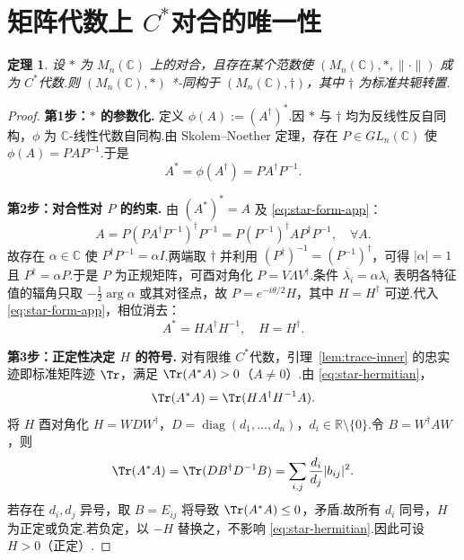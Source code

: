 \documentclass{ctexart}
\newtheorem{theorem}{定理}[section]
\theoremstyle{plain}
\newtheorem*{proof}{证明}
\theoremstyle{plain}
\begin{document}
\section{矩阵代数上 $C^*$对合的唯一性}\label{app:involution-uniqueness}



\begin{theorem}\label{thm:involution-unique}
设 $*$ 为 $M_n(\mathbb{C})$ 上的对合，且存在某个范数使 $(M_n(\mathbb{C}), *, \|\cdot\|)$ 成为 $C^*$代数.则 $(M_n(\mathbb{C}), *)$ *-同构于 $(M_n(\mathbb{C}), \dagger)$，其中 $\dagger$ 为标准共轭转置.
\end{theorem}

\begin{proof}
\textbf{第1步：$*$ 的参数化.} 定义 $\phi(A) := (A^\dagger)^*$.因 $*$ 与 $\dagger$ 均为反线性反自同构，$\phi$ 为 $\mathbb{C}$-线性代数自同构.由 Skolem--Noether 定理，存在 $P \in GL_n(\mathbb{C})$ 使 $\phi(A) = P A P^{-1}$.于是
\begin{equation}\label{eq:star-form-app}
    A^* = \phi(A^\dagger) = P A^\dagger P^{-1}.
\end{equation}

\textbf{第2步：对合性对 $P$ 的约束.} 由 $(A^*)^* = A$ 及 \eqref{eq:star-form-app}：
\begin{equation*}
    A = P (P A^\dagger P^{-1})^\dagger P^{-1} = P (P^{-1})^\dagger A P^\dagger P^{-1}, \quad \forall A.
\end{equation*}
故存在 $\alpha \in \mathbb{C}$ 使 $P^\dagger P^{-1} = \alpha I$.两端取 $\dagger$ 并利用 $(P^\dagger)^{-1} = (P^{-1})^\dagger$，可得 $|\alpha| = 1$ 且 $P^\dagger = \alpha P$.于是 $P$ 为正规矩阵，可酉对角化 $P = V \Lambda V^\dagger$.条件 $\overline{\lambda_i} = \alpha \lambda_i$ 表明各特征值的辐角只取 $-\frac{1}{2}\arg\alpha$ 或其对径点，故 $P = e^{-i\theta/2} H$，其中 $H = H^\dagger$ 可逆.代入 \eqref{eq:star-form-app}，相位消去：
\begin{equation}\label{eq:star-hermitian}
    A^* = H A^\dagger H^{-1}, \quad H = H^\dagger.
\end{equation}

\textbf{第3步：正定性决定 $H$ 的符号.} 对有限维 $C^*$代数，引理~\ref{lem:trace-inner} 的忠实迹即标准矩阵迹 $\Tr$，满足 $\Tr(A^*A) > 0$（$A \neq 0$）.由 \eqref{eq:star-hermitian}，
\begin{equation*}
    \Tr(A^*A) = \Tr(H A^\dagger H^{-1} A).
\end{equation*}
将 $H$ 酉对角化 $H = W D W^\dagger$，$D = \operatorname{diag}(d_1,\dots,d_n)$，$d_i \in \mathbb{R}\setminus\{0\}$.令 $B = W^\dagger A W$，则
\begin{equation*}
    \Tr(A^*A) = \Tr(D B^\dagger D^{-1} B) = \sum_{i,j} \frac{d_i}{d_j} |b_{ij}|^2.
\end{equation*}
若存在 $d_i, d_j$ 异号，取 $B = E_{ij}$ 将导致 $\Tr(A^*A) \le 0$，矛盾.故所有 $d_i$ 同号，$H$ 为正定或负定.若负定，以 $-H$ 替换之，不影响 \eqref{eq:star-hermitian}.因此可设 $H > 0$（正定）.


\end{proof}
\end{document}
